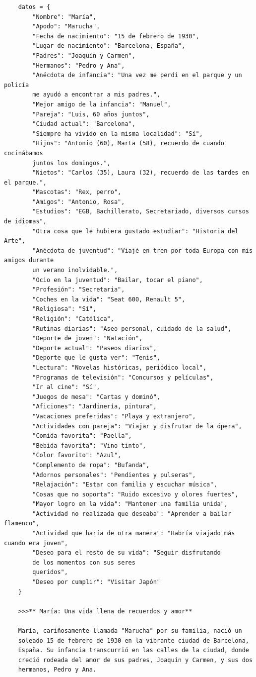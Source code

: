 \begin{verbatim}
	datos = {
		"Nombre": "María",
		"Apodo": "Marucha",
		"Fecha de nacimiento": "15 de febrero de 1930",
		"Lugar de nacimiento": "Barcelona, España",
		"Padres": "Joaquín y Carmen",
		"Hermanos": "Pedro y Ana",
		"Anécdota de infancia": "Una vez me perdí en el parque y un policía 
		me ayudó a encontrar a mis padres.",
		"Mejor amigo de la infancia": "Manuel",
		"Pareja": "Luis, 60 años juntos",
		"Ciudad actual": "Barcelona",
		"Siempre ha vivido en la misma localidad": "Sí",
		"Hijos": "Antonio (60), Marta (58), recuerdo de cuando cocinábamos 
		juntos los domingos.",
		"Nietos": "Carlos (35), Laura (32), recuerdo de las tardes en el parque.",
		"Mascotas": "Rex, perro",
		"Amigos": "Antonio, Rosa",
		"Estudios": "EGB, Bachillerato, Secretariado, diversos cursos de idiomas",
		"Otra cosa que le hubiera gustado estudiar": "Historia del Arte",
		"Anécdota de juventud": "Viajé en tren por toda Europa con mis amigos durante 
		un verano inolvidable.",
		"Ocio en la juventud": "Bailar, tocar el piano",
		"Profesión": "Secretaria",
		"Coches en la vida": "Seat 600, Renault 5",
		"Religiosa": "Sí",
		"Religión": "Católica",
		"Rutinas diarias": "Aseo personal, cuidado de la salud",
		"Deporte de joven": "Natación",
		"Deporte actual": "Paseos diarios",
		"Deporte que le gusta ver": "Tenis",
		"Lectura": "Novelas históricas, periódico local",
		"Programas de televisión": "Concursos y películas",
		"Ir al cine": "Sí",
		"Juegos de mesa": "Cartas y dominó",
		"Aficiones": "Jardinería, pintura",
		"Vacaciones preferidas": "Playa y extranjero",
		"Actividades con pareja": "Viajar y disfrutar de la ópera",
		"Comida favorita": "Paella",
		"Bebida favorita": "Vino tinto",
		"Color favorito": "Azul",
		"Complemento de ropa": "Bufanda",
		"Adornos personales": "Pendientes y pulseras",
		"Relajación": "Estar con familia y escuchar música",
		"Cosas que no soporta": "Ruido excesivo y olores fuertes",
		"Mayor logro en la vida": "Mantener una familia unida",
		"Actividad no realizada que deseaba": "Aprender a bailar flamenco",
		"Actividad que haría de otra manera": "Habría viajado más cuando era joven",
		"Deseo para el resto de su vida": "Seguir disfrutando
		de los momentos con sus seres
		queridos",
		"Deseo por cumplir": "Visitar Japón"
	}
	
	>>>** María: Una vida llena de recuerdos y amor**
	
	María, cariñosamente llamada "Marucha" por su familia, nació un
	soleado 15 de febrero de 1930 en la vibrante ciudad de Barcelona,
	España. Su infancia transcurrió en las calles de la ciudad, donde
	creció rodeada del amor de sus padres, Joaquín y Carmen, y sus dos
	hermanos, Pedro y Ana. 
	

\end{verbatim}
